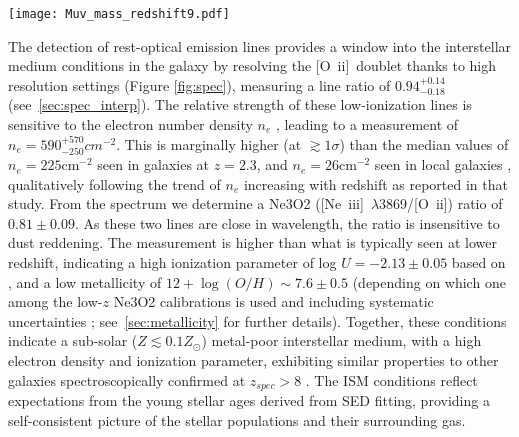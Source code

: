 \documentclass[sn-mathphys]{sn-jnl}%
\theoremstyle{thmstyleone}%
\theoremstyle{thmstyletwo}%
\theoremstyle{thmstylethree}%
\newcommand{\Oii}{[O~{\sc ii}]}
\newcommand{\Neiiia}{[Ne~{\sc iii}]~$\lambda$3869}
\newcommand{\jwst}{\textit{JWST}}
\begin{document}
\begin{figure*}
    \centering
    \texttt{[image: Muv\_mass\_redshift9.pdf]}
    \caption{Left: Absolute UV magnitude of galaxies spectroscopically confirmed with \jwst, corrected for lensing magnification where appropriate. Right: Stellar Mass (log$_{10}($M$_*/$M$_\odot)$) distribution of confirmed galaxies, corrected for magnification where appropriate.
    In both panels, the point shape represents the resolution mode of the NIRSpec spectroscopy (low-resolution PRISM: circles; Medium resolution: squares; High resolution: triangles and star). A black central dot marker indicates the detection of emission lines. 
    Our target (red star with central dot) is one of the intrinsically brightest and most massive galaxies in the epoch of reionization among the current \jwst\ samples from 
    \cite{Williams22, Roberts-Borsani22b, Curtis-lake22, Tang23, Mascia23, Fujimoto23, Wang22, Cameron23, Bunker23}, and the highest and most massive at $z>9$. It is also one of the highest redshift galaxies with emission line detections and the highest redshift one in the high resolution mode. Stellar masses were taken as quoted from each study. Note that as only a subset of the \cite{Tang23} sample have their masses reported and masses aren't provided for \cite{Cameron23}.}
    \label{fig:Muv_redshift}
\end{figure*}

The detection of rest-optical emission lines provides a window into the interstellar medium conditions in the galaxy by resolving the \Oii\ doublet thanks to high resolution settings (Figure \ref{fig:spec}), measuring a line ratio of $0.94^{+0.14}_{-0.18}$ (see~\ref{sec:spec_interp}). The relative strength of these low-ionization lines is sensitive to the electron number density $n_e$ \citep{Sanders16b}, leading to a measurement of $n_e=590^{+570}_{-250}cm^{-2}$. This is marginally higher (at $\gtrsim 1\sigma$) than the median values of $n_e=225$cm$^{-2}$ seen in galaxies at $z=2.3$, and $n_e=26$cm$^{-2}$ seen in local galaxies \citep{Sanders16b}, qualitatively following the trend of $n_e$ increasing with redshift as reported in that study.
From the spectrum we determine a Ne3O2 (\Neiiia/\Oii) ratio of $0.81\pm0.09$. As these two lines are close in wavelength, the ratio is insensitive to dust reddening. The measurement is higher than what is typically seen at lower redshift, indicating a high ionization parameter of log $U=-2.13\pm0.05$ based on \citep{Witstok21}, and a low metallicity of $12+\log(O/H) \sim 7.6 \pm 0.5$ (depending on which one among the low-$z$ Ne3O2 calibrations is used and including systematic uncertainties \cite{Bian18, Shi07, Maiolino_2008, Jones15}; see~\ref{sec:metallicity} for further details). 
Together, these conditions indicate a sub-solar ($Z\lesssim 0.1Z_\odot$) metal-poor interstellar medium, with a high electron density and ionization parameter, exhibiting similar properties to other galaxies spectroscopically confirmed at $z_{spec}>8$  \citep{Katz23, Curti23, Mascia23, Hsiao2022, Fujimoto23, Sanders23, Cameron23}. The ISM conditions reflect expectations from the young stellar ages derived from SED fitting, providing a self-consistent picture of the stellar populations and their surrounding gas.
\end{document}
